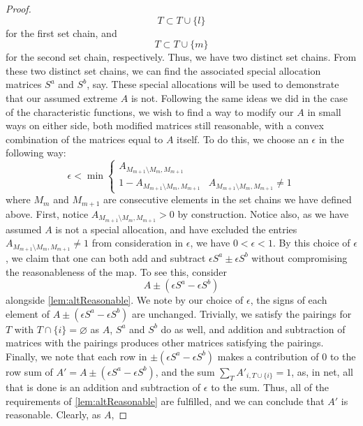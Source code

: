 \documentclass[12pt,letterpaper,final]{article}
\theoremstyle{plain}
\theoremstyle{plain}
\theoremstyle{plain}
\theoremstyle{plain}
\theoremstyle{plain}
\theoremstyle{plain}
\theoremstyle{plain}
\theoremstyle{definition}
\theoremstyle{definition}
\theoremstyle{definition}
\theoremstyle{definition}
\theoremstyle{definition}
\theoremstyle{remark}
\theoremstyle{remark}
\theoremstyle{remark}
\theoremstyle{remark}
\begin{document}
\begin{proof}
  \[
    T \subset T \cup \{l\}
  \]
  for the first set chain, and 
  \[
    T \subset T \cup \{m\}
  \]
  for the second set chain, respectively. Thus, we have two distinct
  set chains. From these two distinct set chains, we can
  find the associated special allocation matrices \(S^a\) and
  \(S^b\), say.
  These special allocations will be used to
  demonstrate that our assumed extreme \(A\) is
  not. Following the same ideas we did in the case of the
  characteristic functions, we
  wish to find a way to modify our \(A\) in small ways on either side,
  both modified matrices still reasonable, with a convex combination
  of the matrices equal to \(A\) itself. To do this, we choose an
  \(\epsilon\) in the following way:
  \begin{equation*}
    \epsilon < \min
    \begin{cases}
      A_{M_{m+1}\setminus M_{m}, M_{m+1}}\\
      1-A_{M_{m+1}\setminus M_{m}, M_{m+1}} & A_{M_{m+1}\setminus
        M_{m}, M_{m+1}} \neq 1
    \end{cases}
  \end{equation*}
  where \(M_m\) and \(M_{m+1}\) are consecutive elements in the set
  chains we have defined above. First, notice \(A_{M_{m+1}\setminus
    M_{m}, M_{m+1}} > 0 \) by construction.
  Notice also, as we have assumed \(A\) is not a special allocation, and have
  excluded the entries \(A_{M_{m+1}\setminus M_{m}, M_{m+1}} \neq 1\)
  from consideration in \(\epsilon\), we have \(0<\epsilon<1\). 
  By this choice of \(\epsilon\), we claim that one can
  both add and subtract \(\epsilon S^a \pm \epsilon S^b\) without
  compromising the reasonableness of the map.
  To see this, consider
  \[
    A \pm (\epsilon S^a - \epsilon S^b)
  \]
  alongside \cref{lem:altReasonable}. We note by our choice of
  \(\epsilon\), the signs of each element of
  \(A \pm (\epsilon S^a - \epsilon S^b)\) are unchanged.  Trivially,
  we satisfy the pairings for \(T\) with \(T\cap\{i\}=\varnothing\) as
  \(A\), \(S^a\) and \(S^b\) do as well, and addition and subtraction
  of matrices with the pairings produces other matrices satisfying the
  pairings. Finally, we note that each row in
  \(\pm(\epsilon S^a - \epsilon S^b)\) makes a contribution of 0 to
  the row sum of \(A' = A\pm(\epsilon S^a - \epsilon S^b)\), and the
  sum \(\sum_{T} A'_{i,T\cup \{i\}}=1\), as, in net, all that is done
  is an addition and subtraction of \(\epsilon\) to the sum. Thus, all
  of the requirements of \cref{lem:altReasonable} are fulfilled, and
  we can conclude that \(A'\) is reasonable. Clearly, as \(A\),

\end{proof}
\end{document}
